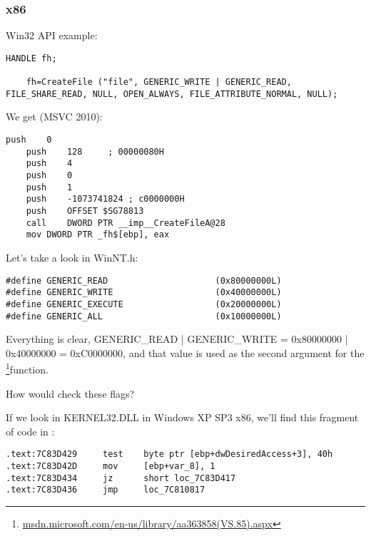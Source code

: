 \subsubsection{x86}

Win32 API example:

\begin{lstlisting}[style=customc]
	HANDLE fh;

	fh=CreateFile ("file", GENERIC_WRITE | GENERIC_READ, FILE_SHARE_READ, NULL, OPEN_ALWAYS, FILE_ATTRIBUTE_NORMAL, NULL);
\end{lstlisting}

We get (MSVC 2010):

\begin{lstlisting}[caption=MSVC 2010,style=customasmx86]
	push	0
	push	128		; 00000080H
	push	4
	push	0
	push	1
	push	-1073741824	; c0000000H
	push	OFFSET $SG78813
	call	DWORD PTR __imp__CreateFileA@28
	mov	DWORD PTR _fh$[ebp], eax
\end{lstlisting}

Let's take a look in WinNT.h:

\begin{lstlisting}[caption=WinNT.h,style=customc]
#define GENERIC_READ                     (0x80000000L)
#define GENERIC_WRITE                    (0x40000000L)
#define GENERIC_EXECUTE                  (0x20000000L)
#define GENERIC_ALL                      (0x10000000L)
\end{lstlisting}

Everything is clear,
GENERIC\_READ | GENERIC\_WRITE = 0x80000000 | 0x40000000 = 0xC0000000,
and that value is used as the second argument for the \footnote{\href{http://go.yurichev.com/17065}{msdn.microsoft.com/en-us/library/aa363858(VS.85).aspx}}function.

How would  check these flags?

If we look in KERNEL32.DLL in Windows XP SP3 x86, we'll find this fragment of code in :

\begin{lstlisting}[caption=KERNEL32.DLL (Windows XP SP3 x86),style=customasmx86]
.text:7C83D429     test    byte ptr [ebp+dwDesiredAccess+3], 40h
.text:7C83D42D     mov     [ebp+var_8], 1
.text:7C83D434     jz      short loc_7C83D417
.text:7C83D436     jmp     loc_7C810817
\end{lstlisting}


